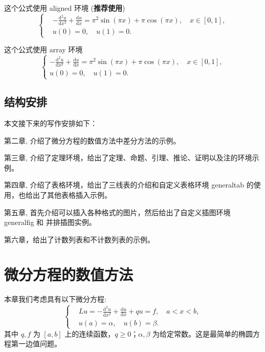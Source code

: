 \documentclass{shnuthesis}
\begin{document}
这个公式使用 aligned 环境 (\textbf{推荐使用})
\begin{equation}\label{eqn:equation1}
\left\{\begin{aligned}
  &-\frac{\mathrm{d}^{2} u}{\mathrm{d} x^{2}}+\frac{\mathrm{d} u}{\mathrm{d} x}=\pi^{2} \sin (\pi x)+\pi \cos (\pi x),\quad x \in [0,1], \\
  &u(0)=0,\quad u(1)=0.
\end{aligned} \right.
\end{equation}

这个公式使用 array 环境
\begin{equation}\label{eqn:equation2}
\left\{\begin{array}{l}
\displaystyle
-\frac{\mathrm{d}^{2} u}{\mathrm{d} x^{2}}+\frac{\mathrm{d} u}{\mathrm{d} x}=\pi^{2} \sin (\pi x)+\pi \cos (\pi x),\quad x \in [0,1], \\[6pt]
u(0)=0,\quad u(1)=0.
\end{array} \right.
\end{equation}
\section{结构安排}

本文接下来的写作安排如下：

第二章,  介绍了微分方程的数值方法中差分方法的示例。

第三章, 介绍了定理环境，给出了定理、命题、引理、推论、证明以及注的环境示例。

第四章, 介绍了表格环境，给出了三线表的介绍和自定义表格环境 generaltab 的使用，也给出了其他表格插入示例。

第五章, 首先介绍可以插入各种格式的图片，然后给出了自定义插图环境 generalfig 和 并排插图实例。

第六章，给出了计数列表和不计数列表的示例。




\chapter{微分方程的数值方法}

本章我们考虑具有以下微分方程:
\begin{equation}\label{eqn11}
\left\{\begin{aligned}
& L u=-\frac{\mathrm{d}^{2} u}{\mathrm{d} x^{2}}+\frac{\mathrm{d} u}{\mathrm{d} x}+q u=f, \quad a < x < b, \\
& u(a)=\alpha, \quad u(b)=\beta.
\end{aligned}\right.
\end{equation}
其中 $q, f$ 为 $[a,b]$ 上的连续函数，$q \geqslant 0$；$\alpha, \beta$ 为给定常数。这是最简单的椭圆方程第一边值问题。
\end{document}
